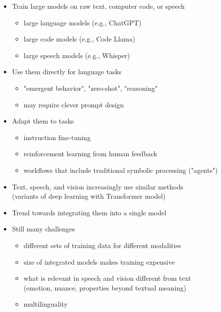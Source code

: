 \documentclass[landscape]{jhuslides3C}
\begin{document}

\vfill
\begin{itemize}
\item Train large models on raw text, computer code, or speech
\begin{itemize}
\item large language models (e.g., ChatGPT)
\item large code models (e.g., Code Llama)
\item large speech models (e.g., Whisper)
\end{itemize}
\item Use them directly for language tasks
\begin{itemize}
\item "emergent behavior", "zero-shot", "reasoning"
\item may require clever prompt design
\end{itemize}
\item Adapt them to tasks
\begin{itemize}
\item instruction fine-tuning
\item reinforcement learning from human feedback
\item workflows that include traditional symbolic processing ("agents")
\end{itemize}
\end{itemize}
\vfill


\vfill
\begin{itemize}
\item Text, speech, and vision increasingly use similar methods\\
(variants of deep learning with Transformer model)
\item Trend towards integrating them into a single model
\item  Still many challenges
\begin{itemize}
\item different sets of training data for different modalities
\item size of integrated models makes training expensive
\item what is relevant in speech and vision different from text\\
(emotion, nuance, properties beyond textual meaning)
\item  multilinguality
\end{itemize}
\end{itemize}
\vfill
\end{document}
